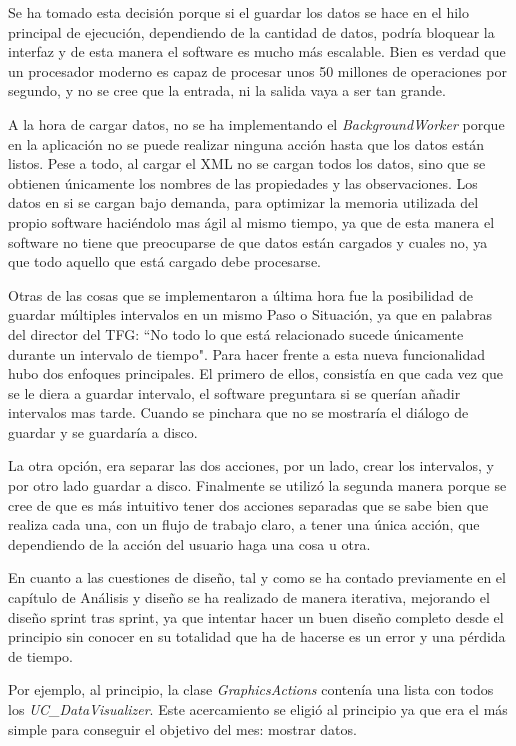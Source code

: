 Se ha tomado esta decisi\'on porque si el guardar los datos se hace en el hilo principal
de ejecuci\'on, dependiendo de la cantidad de datos, podr\'ia bloquear la interfaz y
de esta manera el software es mucho m\'as escalable. Bien es
verdad que un procesador moderno es capaz de procesar unos 50 millones de operaciones por
segundo, y no se cree que la entrada, ni la salida vaya a ser tan grande.

A la hora de cargar datos, no se ha implementando el \emph{BackgroundWorker}
porque en la aplicaci\'on no se puede realizar ninguna acci\'on hasta que los datos est\'an 
listos. Pese a todo, al cargar el XML no se cargan todos los datos, sino que se obtienen \'unicamente
los nombres de las propiedades y las observaciones. Los datos en si se cargan bajo demanda, para optimizar la memoria
utilizada del propio software haci\'endolo mas \'agil al mismo tiempo, ya que de esta manera el software no
tiene que preocuparse de que datos est\'an cargados y cuales no, ya que todo aquello que est\'a cargado debe
procesarse.

Otras de las cosas que se implementaron a \'ultima hora fue la posibilidad de guardar m\'ultiples
intervalos en un mismo Paso o Situaci\'on, ya que en palabras del director del TFG: ``No todo lo que est\'a 
relacionado sucede \'unicamente durante un intervalo de tiempo". Para hacer frente a esta nueva funcionalidad
hubo dos enfoques principales. El primero de ellos, consist\'ia en que cada vez que se le diera a guardar
intervalo, el software preguntara si se quer\'ian a\~nadir intervalos mas tarde. Cuando se pinchara que no
se mostrar\'ia el di\'alogo de guardar y se guardar\'ia a disco.

La otra opci\'on, era separar las dos acciones, por un lado, crear los intervalos, y por otro lado guardar a disco.
Finalmente se utiliz\'o la segunda manera porque se cree de que es m\'as intuitivo tener dos acciones separadas
que se sabe bien que realiza cada una, con un flujo de trabajo claro, a tener una \'unica acci\'on, que dependiendo
de la acci\'on del usuario haga una cosa u otra. 

En cuanto a las cuestiones de dise\~no, tal y como se ha contado previamente en el cap\'itulo
de An\'alisis y dise\~no se ha realizado de manera iterativa, mejorando el dise\~no sprint tras sprint,
ya que intentar hacer un buen dise\~no completo desde el principio sin conocer en su totalidad que ha de hacerse
es un error y una p\'erdida de tiempo.

Por ejemplo, al principio, la clase \emph{GraphicsActions} conten\'ia una lista con todos los 
\emph{UC\_DataVisualizer}. Este
acercamiento se eligi\'o al principio ya que era el m\'as simple para conseguir el objetivo del mes: mostrar datos.

